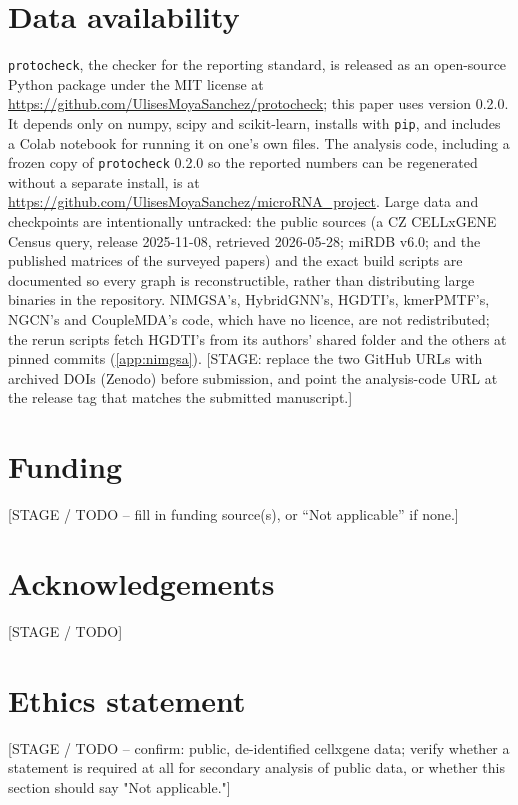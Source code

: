 \documentclass[review]{elsarticle}
\begin{document}
\section*{Data availability}
\texttt{protocheck}, the checker for the reporting standard, is released as an open-source Python
package under the MIT license at \url{https://github.com/UlisesMoyaSanchez/protocheck}; this paper
uses version 0.2.0. It depends only on numpy, scipy and scikit-learn, installs with \texttt{pip}, and
includes a Colab notebook for running it on one's own files. The analysis code, including a frozen
copy of \texttt{protocheck} 0.2.0 so the reported numbers can be regenerated without a separate
install, is at \url{https://github.com/UlisesMoyaSanchez/microRNA_project}. Large data and
checkpoints are intentionally untracked: the public sources (a CZ CELLxGENE Census query, release
2025-11-08, retrieved 2026-05-28; miRDB v6.0; and the published matrices of the surveyed papers)
and the exact build scripts are documented so every graph is reconstructible, rather than
distributing large binaries in the repository. NIMGSA's, HybridGNN's, HGDTI's, kmerPMTF's, NGCN's and CoupleMDA's code, which have no licence, are not
redistributed; the rerun scripts fetch HGDTI's from its authors' shared folder and the others at pinned
commits (\ref{app:nimgsa}).
[STAGE: replace the two GitHub URLs with archived DOIs (Zenodo) before submission, and point the
analysis-code URL at the release tag that matches the submitted manuscript.]

\section*{Funding}
[STAGE / TODO -- fill in funding source(s), or ``Not applicable'' if none.]

\section*{Acknowledgements}
[STAGE / TODO]

\section*{Ethics statement}
[STAGE / TODO -- confirm: public, de-identified cellxgene data; verify whether a
statement is required at all for secondary analysis of public data, or whether this
section should say "Not applicable."]


\end{document}
